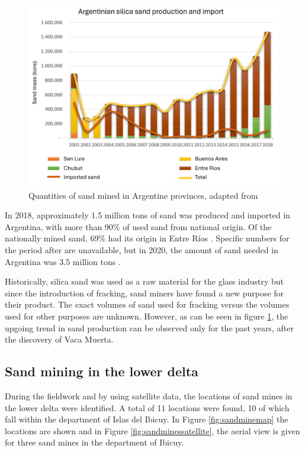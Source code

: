 \begin{figure}[H]
    \centering
    \includegraphics[width=1\linewidth]{figures/ch9/Sandgraphquantities.png}
    \caption{Quantities of sand mined in Argentine provinces, adapted from \autocite{secretariadepoliticamineraArenasParaFracking2019}}
    \label{fig:sanddiagram}
\end{figure}

In 2018, approximately 1.5 million tons of sand was produced and imported in Argentina, with more than 90\% of used sand from national origin. Of the nationally mined sand, 69\% had its origin in Entre Ríos \autocite{secretariadepoliticamineraArenasParaFracking2019}. Specific numbers for the period after are unavailable, but in 2020, the amount of sand needed in Argentina was 3.5 million tons \autocite{novasImpactoAmbientalOculto2022}.

Historically, silica sand was used as a raw material for the glass industry but since the introduction of fracking, sand miners have found a new purpose for their product. The exact volumes of sand used for fracking versus the volumes used for other purposes are unknown. However, as can be seen in figure \ref{fig:sanddiagram}, the upgoing trend in sand production can be observed only for the past years, after the discovery of Vaca Muerta.

\subsection{Sand mining in the lower delta}
During the fieldwork and by using satellite data, the locations of sand mines in the lower delta were identified. A total of 11 locations were found, 10 of which fall within the department of Islas del Ibicuy. In Figure \ref{fig:sandminemap} the locations are shown and in Figure \ref{fig:sandminessatellite}, the aerial view is given for three sand mines in the department of Ibicuy.

